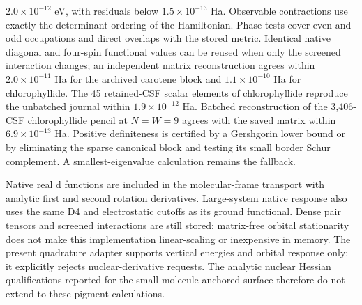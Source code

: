 $2.0\times10^{-12}$ eV, with residuals below $1.5\times10^{-13}$ Ha.
Observable contractions use exactly the determinant ordering of the
Hamiltonian. Phase tests cover even and odd occupations and direct
overlaps with the stored metric. Identical native diagonal and four-spin
functional values can be reused when only the screened interaction
changes; an independent matrix reconstruction agrees within
$2.0\times10^{-11}$ Ha for the archived carotene block and
$1.1\times10^{-10}$ Ha for chlorophyllide. The 45 retained-CSF scalar
elements of chlorophyllide reproduce the unbatched journal within
$1.9\times10^{-12}$ Ha. Batched reconstruction of the 3,406-CSF
chlorophyllide pencil at $N=W=9$ agrees with the saved matrix within
$6.9\times10^{-13}$ Ha. Positive definiteness is certified by a Gershgorin lower bound or by
eliminating the sparse canonical block and testing its small border
Schur complement. A smallest-eigenvalue calculation remains the fallback.


Native real d functions are included in the molecular-frame transport
with analytic first and second rotation derivatives. Large-system native
response also uses the same D4 and electrostatic cutoffs as its ground
functional. Dense pair tensors and screened interactions are still stored:
matrix-free orbital stationarity does not make this implementation
linear-scaling or inexpensive in memory. The present quadrature adapter
supports vertical energies and orbital response only; it explicitly rejects
nuclear-derivative requests. The analytic nuclear Hessian qualifications
reported for the small-molecule anchored surface therefore do not extend
to these pigment calculations.

